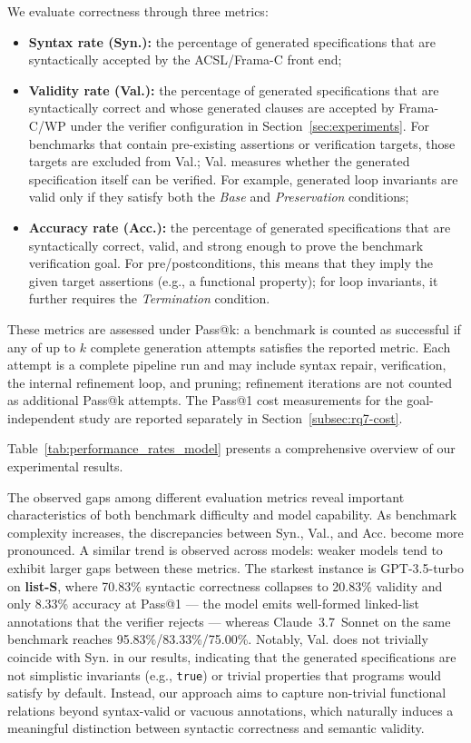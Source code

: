 We evaluate correctness through three metrics:
\begin{itemize}
\item \textbf{Syntax rate (Syn.):} the percentage of generated specifications
that are syntactically accepted by the ACSL/Frama-C front end;
\item \textbf{Validity rate (Val.):} the percentage of generated
specifications that are syntactically correct and whose generated clauses are
accepted by Frama-C/WP under the verifier configuration in Section~\ref{sec:experiments}.
For benchmarks that contain pre-existing assertions or verification targets,
those targets are excluded from Val.; Val. measures whether the generated
specification itself can be verified. For example, generated loop invariants are
valid only if they satisfy both the \textit{Base} and \textit{Preservation}
conditions;
\item \textbf{Accuracy rate (Acc.):} the percentage of generated specifications
that are syntactically correct, valid, and strong enough to prove the benchmark
verification goal. For pre/postconditions, this means that they imply the given
target assertions (e.g., a functional property); for loop invariants, it further
requires the \textit{Termination} condition.
\end{itemize}
\DIFaddbegin
These metrics are assessed under Pass@k: a benchmark is counted as successful if
any of up to $k$ complete generation attempts satisfies the reported metric.
Each attempt is a complete pipeline run and may include syntax repair,
verification, the internal refinement loop, and pruning; refinement iterations
are not counted as additional Pass@k attempts. The Pass@1 cost measurements for
the goal-independent study are reported separately in Section~\ref{subsec:rq7-cost}.
\DIFaddend











Table~\ref{tab:performance_rates_model} presents a comprehensive overview of our experimental results.

The observed gaps among different evaluation metrics reveal important characteristics of both benchmark difficulty and model capability. As benchmark complexity increases, the discrepancies between Syn., Val., and Acc. become more pronounced. A similar trend is observed across models: weaker models tend to exhibit larger gaps between these metrics. The starkest instance is GPT-3.5-turbo on \textbf{list-S}, where 70.83\% syntactic correctness collapses to 20.83\% validity and only 8.33\% accuracy at Pass@1 --- the model emits well-formed linked-list annotations that the verifier rejects --- whereas Claude~3.7~Sonnet on the same benchmark reaches 95.83\%/83.33\%/75.00\%. Notably, Val. does not trivially coincide with Syn. in our results, indicating that the generated specifications are not simplistic invariants (e.g., \texttt{true}) or trivial properties that programs would satisfy by default. Instead, our approach aims to capture non-trivial functional relations beyond syntax-valid or vacuous annotations, which naturally induces a meaningful distinction between syntactic correctness and semantic validity.

